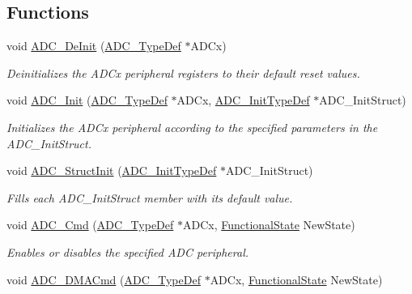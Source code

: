 \subsection*{Functions}
\begin{DoxyCompactItemize}
\item 
void \hyperlink{group___a_d_c___exported___functions_ga31fa6bc09de17125e9db2830ce77c09b}{A\+D\+C\+\_\+\+De\+Init} (\hyperlink{struct_a_d_c___type_def}{A\+D\+C\+\_\+\+Type\+Def} $\ast$A\+D\+Cx)
\begin{DoxyCompactList}\small\item\em Deinitializes the A\+D\+Cx peripheral registers to their default reset values. \end{DoxyCompactList}\item 
void \hyperlink{group___a_d_c___exported___functions_gabbab6038cf8691404350625e477254f9}{A\+D\+C\+\_\+\+Init} (\hyperlink{struct_a_d_c___type_def}{A\+D\+C\+\_\+\+Type\+Def} $\ast$A\+D\+Cx, \hyperlink{struct_a_d_c___init_type_def}{A\+D\+C\+\_\+\+Init\+Type\+Def} $\ast$A\+D\+C\+\_\+\+Init\+Struct)
\begin{DoxyCompactList}\small\item\em Initializes the A\+D\+Cx peripheral according to the specified parameters in the A\+D\+C\+\_\+\+Init\+Struct. \end{DoxyCompactList}\item 
void \hyperlink{group___a_d_c___exported___functions_ga6c6e754d1d0a98d56e465efaf73272ec}{A\+D\+C\+\_\+\+Struct\+Init} (\hyperlink{struct_a_d_c___init_type_def}{A\+D\+C\+\_\+\+Init\+Type\+Def} $\ast$A\+D\+C\+\_\+\+Init\+Struct)
\begin{DoxyCompactList}\small\item\em Fills each A\+D\+C\+\_\+\+Init\+Struct member with its default value. \end{DoxyCompactList}\item 
void \hyperlink{group___a_d_c___exported___functions_ga40882d399e3371755ed610c1134e634e}{A\+D\+C\+\_\+\+Cmd} (\hyperlink{struct_a_d_c___type_def}{A\+D\+C\+\_\+\+Type\+Def} $\ast$A\+D\+Cx, \hyperlink{group___exported__types_gac9a7e9a35d2513ec15c3b537aaa4fba1}{Functional\+State} New\+State)
\begin{DoxyCompactList}\small\item\em Enables or disables the specified A\+DC peripheral. \end{DoxyCompactList}\item 
void \hyperlink{group___a_d_c___exported___functions_gac5881d5995818001584b27b137a8dbcb}{A\+D\+C\+\_\+\+D\+M\+A\+Cmd} (\hyperlink{struct_a_d_c___type_def}{A\+D\+C\+\_\+\+Type\+Def} $\ast$A\+D\+Cx, \hyperlink{group___exported__types_gac9a7e9a35d2513ec15c3b537aaa4fba1}{Functional\+State} New\+State)

\end{DoxyCompactItemize}
